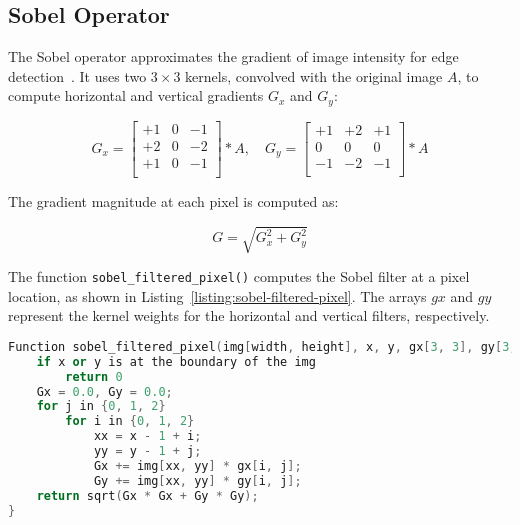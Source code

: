 \subsection{Sobel Operator}
\label{subsec:sobel-operator}

The Sobel operator approximates the gradient of image intensity for edge detection~\cite{kanopoulos1988design}. It uses two \(3 \times 3\) kernels, convolved with the original image \( A \), to compute horizontal and vertical gradients \( G_x \) and \( G_y \):

\[
G_x = \begin{bmatrix}
+1 & 0 & -1 \\
+2 & 0 & -2 \\
+1 & 0 & -1 \\
\end{bmatrix} * A,
\quad
G_y = \begin{bmatrix}
+1 & +2 & +1 \\
0  &  0 &  0 \\
-1 & -2 & -1 \\
\end{bmatrix} * A
\]

The gradient magnitude at each pixel is computed as:

\[
G = \sqrt{G_x^2 + G_y^2}
\]

The function \texttt{sobel\_filtered\_pixel()} computes the Sobel filter at a pixel location, as shown in Listing~\ref{listing:sobel-filtered-pixel}. The arrays \( gx \) and \( gy \) represent the kernel weights for the horizontal and vertical filters, respectively.

\begin{lstlisting}[caption={\textbf{Sobel filtered pixel computation.} Computes the Sobel filter at a specific pixel location.},label={listing:sobel-filtered-pixel},float=htbp,style=mystyle,language=C++]
Function sobel_filtered_pixel(img[width, height], x, y, gx[3, 3], gy[3, 3]) {
    if x or y is at the boundary of the img
        return 0
    Gx = 0.0, Gy = 0.0;
    for j in {0, 1, 2}
        for i in {0, 1, 2}
            xx = x - 1 + i;
            yy = y - 1 + j;
            Gx += img[xx, yy] * gx[i, j];
            Gy += img[xx, yy] * gy[i, j];
    return sqrt(Gx * Gx + Gy * Gy);
}
\end{lstlisting}